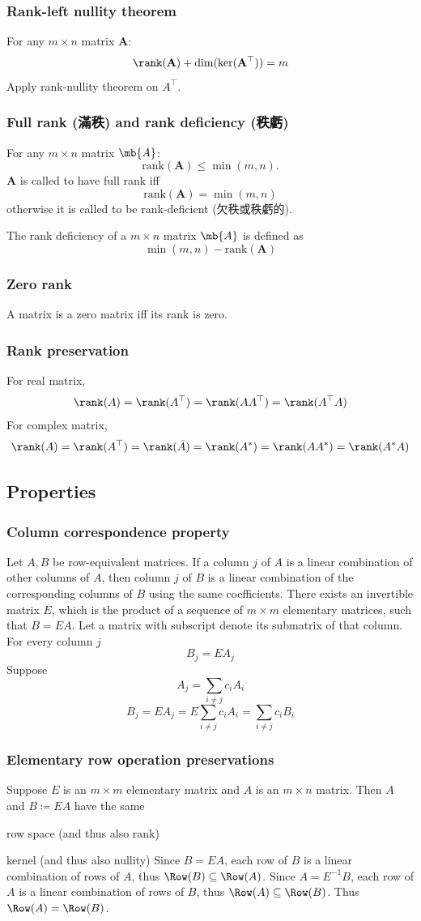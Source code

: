 \documentclass[a4paper,12pt]{report}
\begin{document}
\subsubsection{Rank-left nullity theorem}
For any $m\times n$ matrix $\mathbf{A}$:
\[\rank(\mathbf{A})+\dim(\ker(\mathbf{A}^{\top}))=m\]
\bpr
Apply rank-nullity theorem on $A^{\top}$.
\epr
\subsubsection{Full rank (滿秩) and rank deficiency (秩虧)}
For any $m\times n$ matrix $\mb{A}$:
\[\text{rank}(\mathbf{A}) \leq \min(m, n).\]
$\mathbf{A}$ is called to have full rank iff
\[\text{rank}(\mathbf{A}) = \min(m, n)\]
otherwise it is called to be rank-deficient (欠秩或秩虧的).

The rank deficiency of a $m\times n$ matrix $\mb{A}$ is defined as
\[\min(m, n)-\text{rank}(\mathbf{A}) \]
\subsubsection{Zero rank}
A matrix is a zero matrix iff its rank is zero.
\subsubsection{Rank preservation}
For real matrix,
\[\rank(A)=\rank(A^{\top})=\rank(AA^{\top})=\rank(A^{\top}A)\]
For complex matrix,
\[\rank(A)=\rank(A^{\top})=\rank(\bar{A})=\rank(A^*)=\rank(AA^*)=\rank(A^*A)\]
\subsection{Properties}
\subsubsection{Column correspondence property}
Let $A,B$ be row-equivalent matrices. If a column $j$ of $A$ is a linear combination of other columns of $A$, then column $j$ of $B$ is a linear combination of the corresponding columns of $B$ using the same coefficients.
\bpr
There exists an invertible matrix $E$, which is the product of a sequence of $m\times m$ elementary matrices, such that $B=EA$. Let a matrix with subscript denote its submatrix of that column. For every column $j$
\[B_j=EA_j\]
Suppose
\[A_j=\sum_{i\ne j}c_iA_i\]
\[B_j=EA_j=E\sum_{i\ne j}c_iA_i=\sum_{i\ne j}c_iB_i\]
\epr
\subsubsection{Elementary row operation preservations}
Suppose $E$ is an $m\times m$ elementary matrix and $A$ is an $m\times n$ matrix. Then $A$ and $B\coloneq EA$ have the same
\bit
\item row space (and thus also rank)
\item kernel (and thus also nullity)
\eit
\bpr
Since $B=EA$, each row of $B$ is a linear combination of rows of $A$, thus $\Row(B)\subseteq\Row(A)$. Since $A=E^{-1}B$, each row of $A$ is a linear combination of rows of $B$, thus $\Row(A)\subseteq\Row(B)$. Thus $\Row(A)=\Row(B)$.
\end{document}
